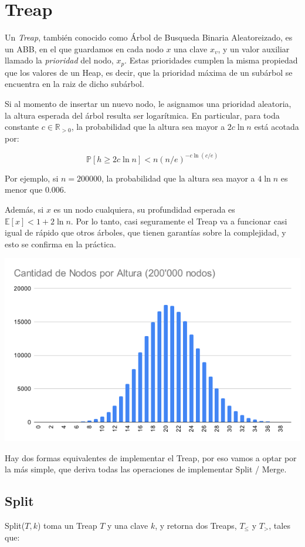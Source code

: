 \section{Treap}

Un \textit{Treap}, también conocido como Árbol de Busqueda Binaria Aleatoreizado, es un ABB, en el que guardamos en cada nodo \(x\) una clave \(x_v\), y
un valor auxiliar llamado la \textit{prioridad} del nodo, \(x_p\). 
Estas prioridades cumplen la misma propiedad que los valores de un Heap, es decir, que la prioridad máxima de un subárbol
se encuentra en la raiz de dicho subárbol.

Si al momento de insertar un nuevo nodo, le asignamos una prioridad aleatoria,
la altura esperada del árbol resulta ser logarítmica. En particular, para toda constante \(c \in \mathbb{R}_{>0}\), la probabilidad que la altura sea mayor a \(2c \ln n\) está acotada por:

\[
\mathbb{P}[h \geq 2c \ln n] < n(n/e)^{-c \ln(c/e)}
\]

Por ejemplo, si \(n = 200000\), la probabilidad que la altura sea mayor a \(4 \ln n\) es menor que \(0.006\).

Además, si \(x\) es un nodo cualquiera, su profundidad esperada es \(\mathbb{E}[x] < 1 + 2 \ln n\). 
Por lo tanto, casi seguramente el Treap va a funcionar casi igual de rápido que otros árboles, que tienen garantías sobre la complejidad, y esto se confirma en la práctica.

\includegraphics[width=0.8\linewidth]{Diagramas/distribucion_nodos.png}

Hay dos formas equivalentes de implementar el Treap, por eso vamos a optar por la más simple, que deriva todas las operaciones de implementar Split / Merge.

\subsection{Split}
Split(\(T, k\)) toma un Treap \(T\) y una clave \(k\), y retorna dos Treaps, \(T_\leq\) y \(T_>\), tales que:

